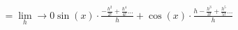 \documentclass[preview]{standalone}
\begin{document}
\begin{align*}
= \lim\limits_ h \to 0  \sin(x) \cdot \frac{- \frac{h^2}{2!} + \frac{h^4}{4!} \dots}{h} + \cos(x) \cdot \frac{h - \frac{h^3}{3!} + \frac{h^5}{5!} \dots}{h}
\end{align*}
\end{document}
